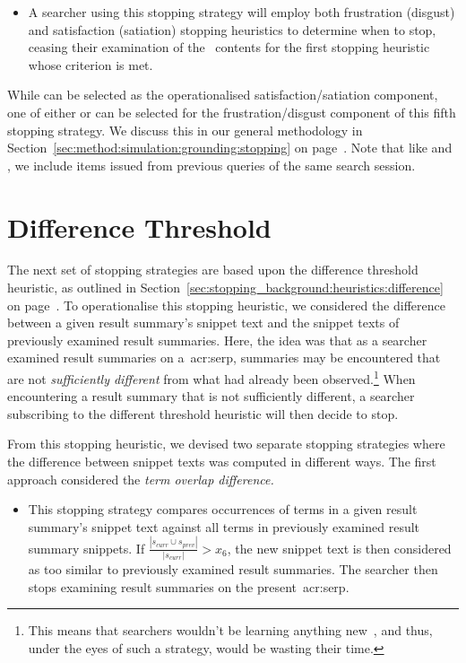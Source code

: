 \begin{itemize}
    \item{ A searcher using this stopping strategy will employ both frustration (disgust) and satisfaction (satiation) stopping heuristics to determine when to stop, ceasing their examination of the~ contents for the first stopping heuristic whose criterion is met.}
\end{itemize}

While  can be selected as the operationalised satisfaction/satiation component, one of either  or  can be selected for the frustration/disgust component of this fifth stopping strategy. We discuss this in our general methodology in Section~\ref{sec:method:simulation:grounding:stopping} on page~\pageref{sec:method:simulation:grounding:stopping}. Note that like  and , we include items issued from previous queries of the same search session.

\section{Difference Threshold}
The next set of stopping strategies are based upon the difference threshold heuristic, as outlined in Section~\ref{sec:stopping_background:heuristics:difference} on page~\pageref{sec:stopping_background:heuristics:difference}. To operationalise this stopping heuristic, we considered the difference between a given result summary's snippet text and the snippet texts of previously examined result summaries. Here, the idea was that as a searcher examined result summaries on a~\gls{acr:serp}, summaries may be encountered that are not \emph{sufficiently different} from what had already been observed.\footnote{This means that searchers wouldn't be learning anything new~\citep{nickles1995judgment}, and thus, under the eyes of such a strategy, would be wasting their time.} When encountering a result summary that is not sufficiently different, a searcher subscribing to the different threshold heuristic will then decide to stop.

From this stopping heuristic, we devised two separate stopping strategies where the difference between snippet texts was computed in different ways. The first approach considered the \emph{term overlap difference.}

\begin{itemize}
    \item{ This stopping strategy compares occurrences of terms in a given result summary's snippet text against all terms in previously examined result summary snippets. If $\frac{|s_{curr} \cup s_{prev}|}{|s_{curr}|} > x_6$, the new snippet text is then considered as too similar to previously examined result summaries. The searcher then stops examining result summaries on the present~\gls{acr:serp}.}
\end{itemize}

